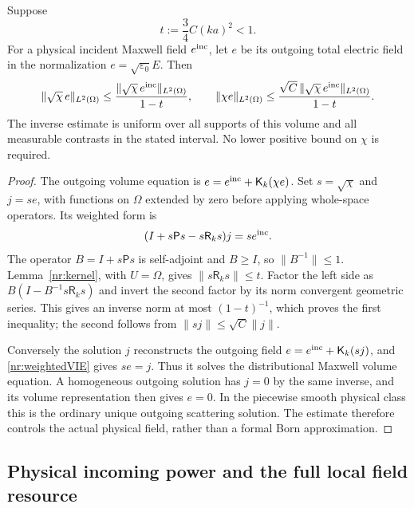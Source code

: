 \begin{theorem}
\label{nr:volumeinverse}
Suppose
\begin{equation}
 t:=\frac34 C(ka)^2<1.
 \label{nr:smallvolume}
\end{equation}
For a physical incident Maxwell field $e^{\rm inc}$, let $e$ be its
outgoing total electric field in the normalization
$e=\sqrt{\varepsilon_0}E$. Then
\begin{equation}
 \|\sqrt\chi\,e\|_{L^2(\Omega)}
 \leq\frac{\|\sqrt\chi\,e^{\rm inc}\|_{L^2(\Omega)}}{1-t},\qquad
 \|\chi e\|_{L^2(\Omega)}
 \leq\frac{\sqrt C\,\|\sqrt\chi\,e^{\rm inc}\|_{L^2(\Omega)}}{1-t}.
 \label{nr:weightedbound}
\end{equation}
The inverse estimate is uniform over all supports of this volume and all
measurable contrasts in the stated interval. No lower positive bound on
$\chi$ is required.
\end{theorem}
\begin{proof}
The outgoing volume equation is
$e=e^{\rm inc}+\mathsf K_k(\chi e)$.
Set $s=\sqrt\chi$ and $j=se$, with functions on $\Omega$ extended by zero
before applying whole-space operators. Its weighted form is
\begin{equation}
 (I+s\mathsf P s-s\mathsf R_k s)j=se^{\rm inc}.
 \label{nr:weightedVIE}
\end{equation}
The operator $B=I+s\mathsf P s$ is self-adjoint and $B\geq I$, so
$\|B^{-1}\|\leq1$. Lemma~\ref{nr:kernel}, with $U=\Omega$, gives
$\|s\mathsf R_k s\|\leq t$. Factor the left side as
$B(I-B^{-1}s\mathsf R_k s)$ and invert the second factor by its norm
convergent geometric series. This gives an inverse norm at most $(1-t)^{-1}$,
which proves the first inequality; the second follows from
$\|sj\|\leq\sqrt C\|j\|$.

Conversely the solution $j$ reconstructs the outgoing field
$e=e^{\rm inc}+\mathsf K_k(sj)$, and \eqref{nr:weightedVIE} gives $se=j$.
Thus it solves the distributional Maxwell volume equation. A homogeneous
outgoing solution has $j=0$ by the same inverse, and its volume
representation then gives $e=0$. In the piecewise smooth physical class
this is the ordinary unique outgoing scattering solution. The estimate
therefore controls the actual physical field, rather than a formal Born
approximation.
\end{proof}

\subsection{Physical incoming power and the full local field resource}

